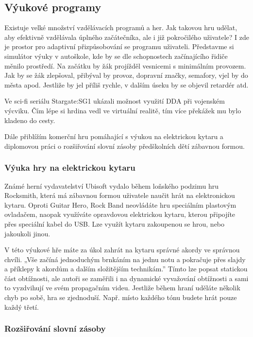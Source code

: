 \subsection{Výukové programy}

Existuje velké množství vzdělávacích programů a her. Jak takovou hru udělat, aby efektivně vzdělávala úplného začátečníka, ale i již pokročilého uživatele? I zde je prostor pro adaptivní přizpůsobování se programu uživateli. Představme si simulátor výuky v autoškole, kde by se dle schopnostech začínajícího řidiče měnilo prostředí. Na začátku by žák projížděl vesnicemi s minimálním provozem. Jak by se žák zlepšoval, přibýval by provoz, dopravní značky, semafory, vjel by do města apod. Jestliže by jel příliš rychle, v dalším úseku by se objevil retardér atd.

Ve sci-fi seriálu Stargate:SG1 ukázali možnost využití DDA při vojenském výcviku. Čím lépe si hrdina vedl ve virtuální realitě, tím více překážek mu bylo kladeno do cesty. \cite{11Stargate} 

Dále přiblížím komerční hru pomáhající s výukou na elektrickou kytaru a diplomovou práci o rozšiřování slovní zásoby předškolních dětí zábavnou formou.

\subsubsection{Výuka hry na elektrickou kytaru}

Známé herní vydavatelství Ubisoft vydalo během loňského podzimu hru Rocksmith, která má zábavnou formou uživatele naučit hrát na elektronickou kytaru. Oproti Guitar Hero, Rock Band neovládáte hru speciálním plastovým ovladačem, naopak využíváte opravdovou elektrickou kytaru, kterou připojíte přes speciální kabel do USB. Lze využít kytaru zakoupenou se hrou, nebo jakoukoli jinou.

V této výukové hře máte za úkol zahrát na kytaru správné akordy ve správnou chvíli. „Vše začíná jednoduchým brnkáním na jednu notu a pokračuje přes slajdy a příklepy k akordům a dalším složitějším technikám.”\cite{12RocksmithRev} Tímto lze popsat statickou část obtížnosti, ale autoři se zaměřili i na dynamické vyvažování obtížnosti a sami to vyzdvihují ve svém propagačním videu.\cite{13RocksmithVid} Jestliže během hraní uděláte několik chyb po sobě, hra se zjednoduší. Např. místo každého tónu budete hrát pouze každý třetí.

\subsubsection{Rozšiřování slovní zásoby}

